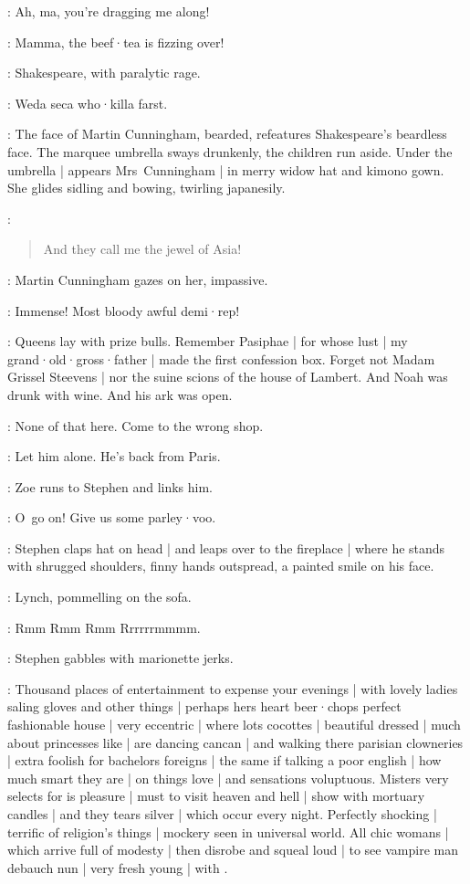 \Freddy[5a]:
Ah,
ma,
you're dragging me along!

\Susy[5b]:
Mamma,
the beef·tea is fizzing over!

:
Shakespeare,
with paralytic rage.

\Shakespeare:
Weda seca who·killa farst.

:
The face of Martin Cunningham,
bearded,
refeatures Shakespeare's beardless face.
The marquee umbrella sways drunkenly,
the children run aside.
Under the umbrella |
appears Mrs~Cunningham |
in merry widow hat and kimono gown.
She glides sidling and bowing,
twirling japanesily.

\MrsCunningham:
\begin{verse}
    And they call me the jewel of Asia!
\end{verse}

:
Martin Cunningham gazes on her,
impassive.

\MartinCunningham:
Immense!
Most bloody awful demi·rep!


\Stephen:
Queens lay with prize bulls.
Remember Pasiphae |
for whose lust |
my grand·old·gross·father |
made the first confession box.
Forget not Madam Grissel Steevens |
nor the suine scions of the house of Lambert.
And Noah was drunk with wine.
And his ark was open.

\Bella:
None of that here.
Come to the wrong shop.

\Lynch:
Let him alone.
He's back from Paris.

:
Zoe runs to Stephen and links him.

\Zoe:
O~go on!
Give us some parley·voo.

:
Stephen claps hat on head |
and leaps over to the fireplace |
where he stands with shrugged shoulders,
finny hands outspread,
a painted smile on his face.

:
Lynch,
pommelling on the sofa.

\Lynch:
Rmm Rmm Rmm Rrrrrrmmmm.

:
Stephen gabbles with marionette jerks.

\Stephen:
Thousand places of entertainment to expense your evenings |
with lovely ladies saling gloves and other things |
perhaps hers heart beer·chops perfect fashionable house |
very eccentric |
where lots cocottes |
beautiful dressed |
much about princesses like |
are dancing cancan |
and walking there parisian clowneries |
extra foolish for bachelors foreigns |
the same if talking a poor english |
how much smart they are |
on things love |
and sensations voluptuous.
Misters very selects for is pleasure |
must to visit heaven and hell |
show with mortuary candles |
and they tears silver |
which occur every night.
%
Perfectly shocking |
terrific of religion's things |
mockery seen in universal world.
All chic womans |
which arrive full of modesty |
then disrobe and squeal loud |
to see vampire man debauch nun |
very fresh young |
with .

